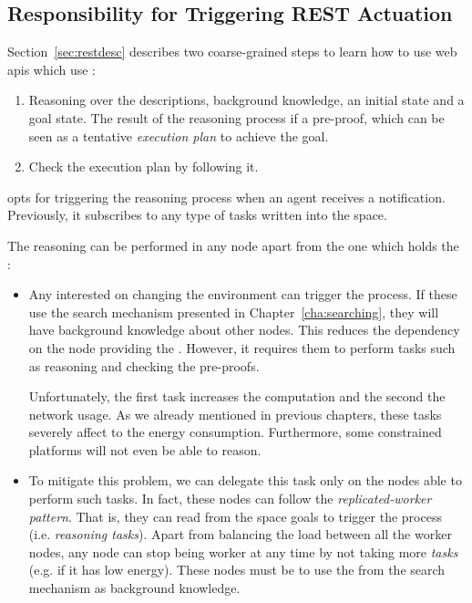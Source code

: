 \subsection{Responsibility for Triggering REST Actuation}
\label{sec:responsible_proof}

Section~\ref{sec:restdesc} describes two coarse-grained steps to learn how to use web \acsp{api} which use \restdesc{}:
\begin{enumerate}
  \item Reasoning over the descriptions, background knowledge, an initial state and a goal state.
        The result of the reasoning process if a pre-proof, which can be seen as a tentative \emph{execution plan} to achieve the goal.
  \item Check the execution plan by following it.
\end{enumerate}


\implMix{} opts for triggering the reasoning process when an agent receives a notification.
Previously, it subscribes to any type of tasks written into the space.


The reasoning can be performed in any node apart from the one which holds the \Space{}:

\begin{itemize}
  \item Any \consumer{} interested on changing the environment can trigger the process.
	If these \consumers{} use the search mechanism presented in Chapter~\ref{cha:searching}, they will have background knowledge about other nodes.
	This reduces the dependency on the node providing the \coordspace{}.
	However, it requires them to perform tasks such as reasoning and checking the pre-proofs.
	
	Unfortunately, the first task increases the computation and the second the network usage.
	As we already mentioned in previous chapters, these tasks severely affect to the energy consumption.
	Furthermore, some constrained platforms will not even be able to reason.
	
  \item To mitigate this problem, we can delegate this task only on the nodes able to perform such tasks.
	In fact, these nodes can follow the \emph{replicated-worker pattern}.
	That is, they can read from the space goals to trigger the process (i.e. \emph{reasoning tasks}).
	Apart from balancing the load between all the worker nodes, any node can stop being worker at any time by not taking more \emph{tasks} (e.g. if it has low energy).
	These nodes must be \consumers{} to use the \clues{} from the search mechanism as background knowledge.
\end{itemize}


